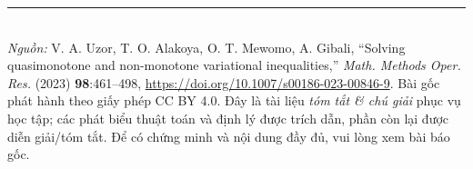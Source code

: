 \documentclass{MyBook}
\theoremstyle{plain}
\theoremstyle{definition}
\begin{document}
\vfill
\noindent\rule{\linewidth}{0.4pt}\\[2pt]
{\footnotesize\textit{Nguồn:} V. A. Uzor, T. O. Alakoya, O. T. Mewomo, A. Gibali, ``Solving quasimonotone and non-monotone variational inequalities,'' \textit{Math. Methods Oper. Res.} (2023) \textbf{98}:461--498, \url{https://doi.org/10.1007/s00186-023-00846-9}. Bài gốc phát hành theo giấy phép CC BY 4.0. Đây là tài liệu \emph{tóm tắt \& chú giải} phục vụ học tập; các phát biểu thuật toán và định lý được trích dẫn, phần còn lại được diễn giải/tóm tắt. Để có chứng minh và nội dung đầy đủ, vui lòng xem bài báo gốc.}
\end{document}
